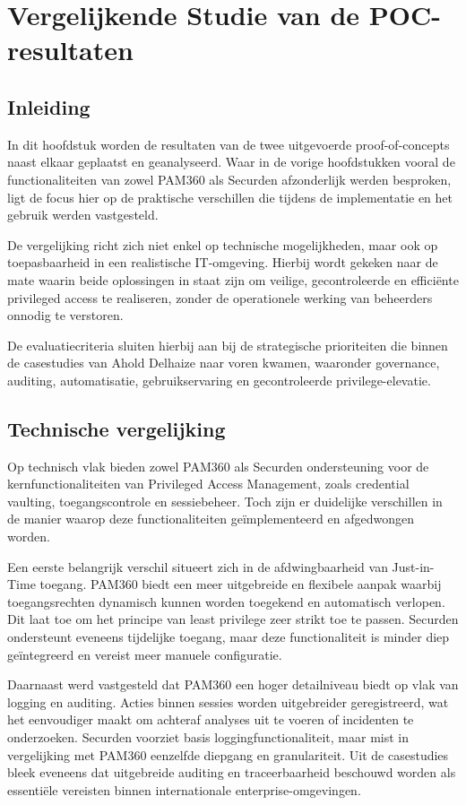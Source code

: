 \chapter{Vergelijkende Studie van de POC-resultaten}
\label{ch:vergelijkende-Studie-met-poc}
\section{Inleiding}
In dit hoofdstuk worden de resultaten van de twee uitgevoerde proof-of-concepts naast elkaar geplaatst en geanalyseerd. Waar in de vorige hoofdstukken vooral de functionaliteiten van zowel PAM360 als Securden afzonderlijk werden besproken, ligt de focus hier op de praktische verschillen die tijdens de implementatie en het gebruik werden vastgesteld.

De vergelijking richt zich niet enkel op technische mogelijkheden, maar ook op toepasbaarheid in een realistische IT-omgeving. Hierbij wordt gekeken naar de mate waarin beide oplossingen in staat zijn om veilige, gecontroleerde en efficiënte privileged access te realiseren, zonder de operationele werking van beheerders onnodig te verstoren.

De evaluatiecriteria sluiten hierbij aan bij de strategische prioriteiten die binnen de casestudies van Ahold Delhaize naar voren kwamen, waaronder governance, auditing, automatisatie, gebruikservaring en gecontroleerde privilege-elevatie.

\section{Technische vergelijking}
Op technisch vlak bieden zowel PAM360 als Securden ondersteuning voor de kernfunctionaliteiten van Privileged Access Management, zoals credential vaulting, toegangscontrole en sessiebeheer. Toch zijn er duidelijke verschillen in de manier waarop deze functionaliteiten geïmplementeerd en afgedwongen worden.

Een eerste belangrijk verschil situeert zich in de afdwingbaarheid van Just-in-Time toegang. PAM360 biedt een meer uitgebreide en flexibele aanpak waarbij toegangsrechten dynamisch kunnen worden toegekend en automatisch verlopen. Dit laat toe om het principe van least privilege zeer strikt toe te passen. Securden ondersteunt eveneens tijdelijke toegang, maar deze functionaliteit is minder diep geïntegreerd en vereist meer manuele configuratie.

Daarnaast werd vastgesteld dat PAM360 een hoger detailniveau biedt op vlak van logging en auditing. Acties binnen sessies worden uitgebreider geregistreerd, wat het eenvoudiger maakt om achteraf analyses uit te voeren of incidenten te onderzoeken. Securden voorziet basis loggingfunctionaliteit, maar mist in vergelijking met PAM360 eenzelfde diepgang en granulariteit. Uit de casestudies bleek eveneens dat uitgebreide auditing en traceerbaarheid beschouwd worden als essentiële vereisten binnen internationale enterprise-omgevingen.

